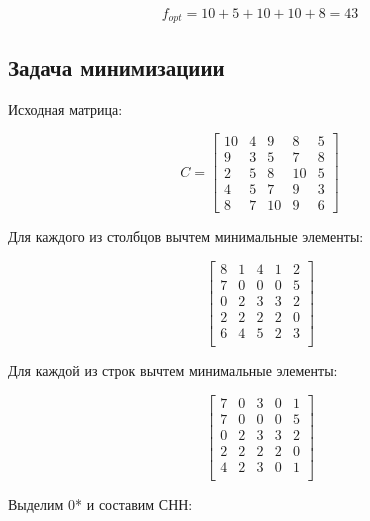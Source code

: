 \documentclass[a4paper,14pt]{article}
\begin{document}
\begin{equation}
f_{opt} = 10+5+10+10+8=43
\end{equation}

\subsection{Задача минимизациии}

Исходная матрица:

\begin{equation} C=
\begin{bmatrix}
10 & 4 & 9 & 8 & 5\\
9 & 3 & 5 & 7 & 8\\
2 & 5 & 8 & 10 & 5\\
4 & 5 & 7 & 9 & 3\\
8 & 7 & 10 & 9 & 6
\end{bmatrix}
\end{equation}

Для каждого из столбцов вычтем минимальные элементы:

\begin{equation}
\begin{bmatrix}
	 8  &   1  &   4  &   1  &   2\\
     7  &   0  &   0  &   0  &   5\\
     0  &   2  &   3  &   3  &   2\\
     2  &   2  &   2  &   2  &   0\\
     6  &   4  &   5  &   2  &   3\\
\end{bmatrix}
\end{equation}

Для каждой из строк вычтем минимальные элементы:

\begin{equation}
\begin{bmatrix}
     7  &   0  &   3  &   0  &   1\\
     7  &   0  &   0  &   0  &   5\\
     0  &   2  &   3  &   3  &   2\\
     2  &   2  &   2  &   2  &   0\\
     4  &   2  &   3  &   0  &   1\\
\end{bmatrix}
\end{equation}

\newpage
Выделим 0* и составим СНН:
\end{document}
